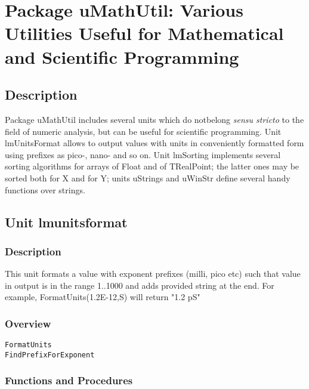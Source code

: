 \documentclass[12pt,a4paper,oneside]{report}
\newcommand{\lmath}[1]{   %
	\marginpar{\vspace{#1} 
		\begin{flushright}
			LMath
	\end{flushright} }
}
\begin{document}
\chapter{Package uMathUtil: Various Utilities Useful for Mathematical and Scientific Programming}\label{package-umathutil}
\section{Description}
Package uMathUtil includes several units which do notbelong \textit{sensu stricto} to the field of numeric analysis, but can be useful for scientific programming. Unit lmUnitsFormat allows to output values with units in conveniently formatted form using prefixes as pico-, nano- and so on. Unit lmSorting implements several sorting algorithms for arrays of Float and of TRealPoint; the latter ones may be sorted both for X and for Y; units uStrings and uWinStr define several handy functions over strings.   
\section{Unit lmunitsformat}\lmath{-24pt}
\label{lmunitsformat}
\subsection{Description}
This unit formats a value with exponent prefixes (milli, pico etc) such that value in output is in the range 1..1000 and adds provided string at the end. For example, FormatUnits(1.2E{-}12,S) will return "1.2 pS"
\subsection{Overview}
\begin{description}
	\item[\texttt{FormatUnits}]
	\item[\texttt{FindPrefixForExponent}]
\end{description}
\subsection{Functions and Procedures}
\end{document}
